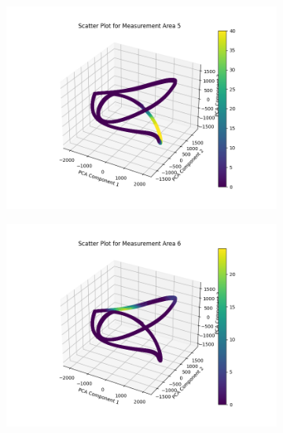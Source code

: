 \begin{itemize}
\begin{figure}[H]
\begin{subfigure}{0.3\textwidth}
        \includegraphics[width=\linewidth]
        {images/task5_2_5.png}
        \label{task5_2_5}
    \end{subfigure}
    \begin{subfigure}{0.3\textwidth}
        \includegraphics[width=\linewidth]
        {images/task5_2_6.png}
        \label{task5_2_6}
    \end{subfigure}
    \begin{subfigure}{0.3\textwidth}

\end{subfigure}
\end{figure}
\end{itemize}
